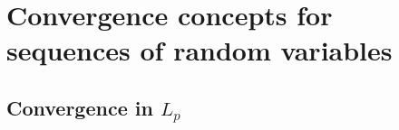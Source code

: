 

\chapter{Convergence concepts for sequences of random variables}

\section{Convergence in $L_p$}

